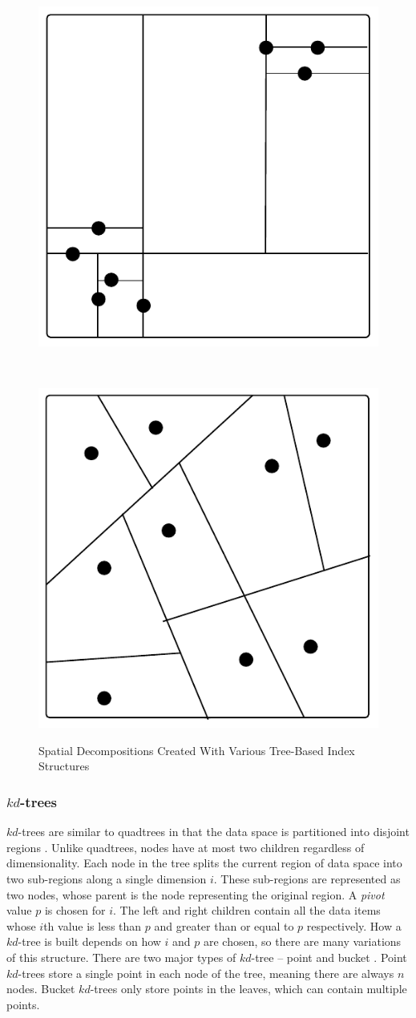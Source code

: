 \begin{figure}
\begin{center}
\begin{subfloat}{%
			\includegraphics[scale=0.4]{figures/kdtree_clustered.pdf}
		}
		\end{subfloat}~~~~~
		\begin{subfloat}{%
			\includegraphics[scale=0.4]{figures/bsp_tree.pdf}
		}
		\end{subfloat}
	\end{center}

	\caption{Spatial Decompositions Created With Various Tree-Based Index Structures}
	\label{fig:tree-based-decomposition}
\end{figure}

\subsubsection{$kd$-trees}

$kd$-trees are similar to quadtrees in that the data space is partitioned into disjoint regions \cite{kd-tree}. Unlike quadtrees, nodes have at most two children regardless of dimensionality. Each node in the tree splits the current region of data space into two sub-regions along a single dimension $i$. These sub-regions are represented as two nodes, whose parent is the node representing the original region. A \textit{pivot} value $p$ is chosen for $i$. The left and right children contain all the data items whose $i$th value is less than $p$ and greater than or equal to $p$ respectively. How a $kd$-tree is built depends on how $i$ and $p$ are chosen, so there are many variations of this structure. There are two major types of $kd$-tree -- point and bucket \cite{md-structures-samet}. Point $kd$-trees store a single point in each node of the tree, meaning there are always $n$ nodes. Bucket $kd$-trees only store points in the leaves, which can contain multiple points.

